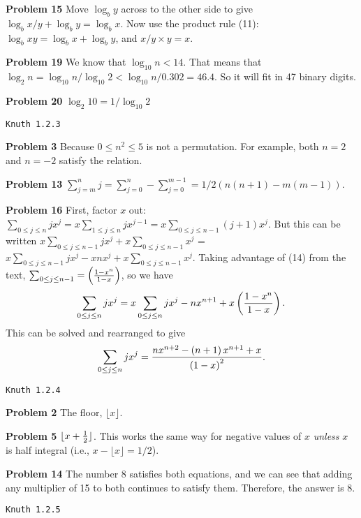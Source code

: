 \vskip 0.1in
\noindent
{\bf Problem 15} Move $\log_b y$ across to the other side to give $\log_b x/y + \log_b y = \log_b x$.
 Now use the product rule (11): $\log_b xy = \log_b x + \log_b y$, and $x/y \times y = x$.

\vskip 0.1in
\noindent
{\bf Problem 19} We know that $\log_{10} n < 14$.  That means that $\log_2 n = \log_{10} n /
  \log_{10} 2 < \log_{10} n / 0.302 = 46.4$.  So it will fit in 47 binary digits.

\vskip 0.1in
\noindent
{\bf Problem 20} $\log_2 10 = 1 / \log_{10} 2$

\vskip 0.5in
\centerline{\tt Knuth 1.2.3}
\vskip 0.3in

\noindent
{\bf Problem 3} Because $0 \le n^2 \le 5$ is not a permutation.  For example, both $n=2$ and $n=-2$
 satisfy the relation.
 
\vskip 0.1in
\noindent
{\bf Problem 13} $\sum_{j=m}^{n} j = \sum_{j=0}^{n} - \sum_{j=0}^{m-1} = 1/2 \left( n \left(n+1\right) -
   m \left(m-1\right) \right)$.
   
\vskip 0.1in
\noindent
{\bf Problem 16} First, factor $x$ out: $\sum_{0 \le j \le n} j x^j = x \sum_{1 \le j \le n} j x^{j-1} =
 x \sum_{0 \le j \le n-1} \left(j + 1 \right) x^j$. But this can be written 
 $x \sum_{0 \le j \le n-1} j x^j + x \sum_{0 \le j \le n-1} x^j$ = $x \sum_{0 \le j \le n-1} j x^j - x n x^j
 + x \sum_{0 \le j \le n-1} x^j$.  Taking advantage of (14) from the text, $ \sum_{0 \le j \le n-1} =
  \left( { 1 - x^n } \over 1 - x \right)$, so we have 
  $$ \sum_{0 \le j \le n} j x^j = x \sum_{0 \le j \le n} j x^j - n x^{n+1} + x \left( { 1 - x^n} \over 1-x \right).$$
 This can be solved and rearranged to give
 $$ 
   \sum_{0 \le j \le n} j x^j = {n x^{n+2} - \left( n + 1 \right) x^{n+1} + x \over \left( 1 - x \right)^2}.
 $$

\vskip 0.5in
\centerline{\tt Knuth 1.2.4}
\vskip 0.3in

\noindent
{\bf Problem 2} The floor, $\lfloor x \rfloor$.

\vskip 0.1in
\noindent
{\bf Problem 5} $\lfloor x + {1 \over 2} \rfloor$.  This works the same way for negative
 values of $x$ {\it unless} $x$ is half integral (i.e., $x - \lfloor x \rfloor = 1/2$).

\vskip 0.1in
\noindent
{\bf Problem 14} The number 8 satisfies both equations, and we can see that adding
 any multiplier of 15 to both continues to satisfy them.  Therefore, the answer is 8.
 
\vskip 0.5in
\centerline{\tt Knuth 1.2.5}
\vskip 0.3in

